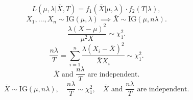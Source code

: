 \documentclass{article}
\begin{document}
\begin{enumerate}[(a)]
\[	      \]
	      \[
		      L(\mu,\lambda | \bar{X}, T) = f_1(\bar{X}|\mu, \lambda) \cdot f_2(T|\lambda),
	      \]
	      \[
		      X_1, \dots, X_n \sim \text{IG}(\mu, \lambda) \implies \bar{X} \sim \text{IG}(\mu, n\lambda).
	      \]
	      \[
		      \frac{\lambda (X-\mu)^2}{\mu^2 X} \sim \chi^2_1.
	      \]
	      \[
		      \frac{n \lambda}{T} = \sum_{i=1}^n \frac{\lambda (X_i - \bar{X})^2}{\bar{X} X_i} \sim \chi^2_1.
	      \]
	      \[
		      \bar{X} \text{ and } \frac{n \lambda}{T} \text{ are independent}.
	      \]
	      \[
		      \boxed{
			      \bar{X} \sim \text{IG}(\mu, n \lambda), \quad
			      \frac{n \lambda}{T} \sim \chi^2_1, \quad
			      \bar{X} \text{ and } \frac{n \lambda}{T} \text{ are independent.}
		      }
	      \]
\end{enumerate}
\end{document}
